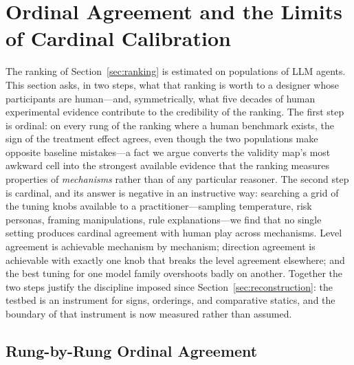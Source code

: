 
\section{Ordinal Agreement and the Limits of Cardinal Calibration}\label{sec:humans}

The ranking of Section~\ref{sec:ranking} is estimated on populations of LLM agents. This section asks, in two steps, what that ranking is worth to a designer whose participants are human---and, symmetrically, what five decades of human experimental evidence contribute to the credibility of the ranking. The first step is ordinal: on every rung of the ranking where a human benchmark exists, the sign of the treatment effect agrees, even though the two populations make opposite baseline mistakes---a fact we argue converts the validity map's most awkward cell into the strongest available evidence that the ranking measures properties of \emph{mechanisms} rather than of any particular reasoner. The second step is cardinal, and its answer is negative in an instructive way: searching a grid of the tuning knobs available to a practitioner---sampling temperature, risk personas, framing manipulations, rule explanations---we find that no single setting produces cardinal agreement with human play across mechanisms. Level agreement is achievable mechanism by mechanism; direction agreement is achievable with exactly one knob that breaks the level agreement elsewhere; and the best tuning for one model family overshoots badly on another. Together the two steps justify the discipline imposed since Section~\ref{sec:reconstruction}: the testbed is an instrument for signs, orderings, and comparative statics, and the boundary of that instrument is now measured rather than assumed.

\subsection{Rung-by-Rung Ordinal Agreement}\label{sec:humans-rungs}

